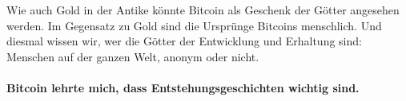 Wie auch Gold in der Antike könnte Bitcoin als Geschenk der Götter angesehen
werden. Im Gegensatz zu Gold sind die Ursprünge Bitcoins menschlich. Und diesmal
wissen wir, wer die Götter der Entwicklung und Erhaltung sind: Menschen auf der
ganzen Welt, anonym oder nicht.

\paragraph{Bitcoin lehrte mich, dass Entstehungsgeschichten wichtig sind.}

%
%
%
%
